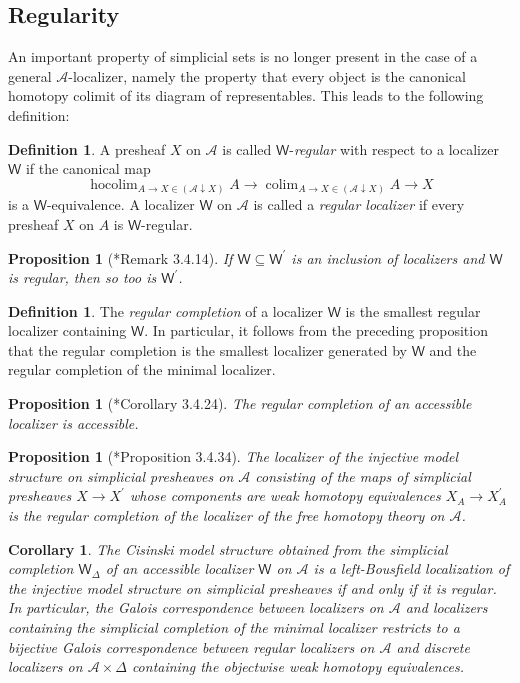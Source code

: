 \documentclass[a4paper]{article}
\numberwithin{equation}{subsection}
\theoremstyle{plain}   %
\newtheorem{prop}[equation]{Proposition}
\newtheorem{cor}[equation]{Corollary}
\theoremstyle{definition}
\newtheorem{defn}[equation]{Definition}
\theoremstyle{remark}
\theoremstyle{plain}
\DeclareMathOperator*{\coliml}{colim}
\newcommand{\overcat}[2]{{\left(#1\downarrow #2\right)}}
\DeclareMathOperator*{\hocoliml}{hocolim}
\begin{document}
\subsection{Regularity}
An important property of simplicial sets is no longer present in the case of a general \(\mathcal{A}\)-localizer, namely the property that every object is the canonical homotopy colimit of its diagram of representables.  This leads to the following definition:
\begin{defn}
	A presheaf \(X\) on \(\mathcal{A}\) is called \(\mathsf{W}\)-\emph{regular} with respect to a localizer \(\mathsf{W}\) if the canonical map 
	\[
		\hocoliml_{A\to X\in \overcat{\mathcal{A}}{X}} A \to \coliml_{A\to X\in \overcat{\mathcal{A}}{X}} A \to X
	\]
	is a \(\mathsf{W}\)-equivalence.
	A localizer \(\mathsf{W}\) on \(\mathcal{A}\) is called a \emph{regular localizer} if every presheaf \(X\) on \(A\) is \(\mathsf{W}\)-regular.
\end{defn}
\begin{prop}[\cite{cisinski-book}*{Remark 3.4.14}]\label{regularinclusion}
	If \(\mathsf{W} \subseteq \mathsf{W}^\prime\) is an inclusion of localizers and \(\mathsf{W}\) is regular, then so too is \(\mathsf{W^\prime}\).  
\end{prop}
\begin{defn}\label{regcompletion}
	The \emph{regular completion} of a localizer \(\mathsf{W}\) is the smallest regular localizer containing \(\mathsf{W}\).  In particular, it follows from the preceding proposition that the regular completion is the smallest localizer generated by \(\mathsf{W}\) and the regular completion of the minimal localizer.
\end{defn}
\begin{prop}[\cite{cisinski-book}*{Corollary 3.4.24}]
	The regular completion of an accessible localizer is accessible.
\end{prop}
\begin{prop}[\cite{cisinski-book}*{Proposition 3.4.34}]\label{injregular}
	The localizer of the injective model structure on simplicial presheaves on \(\mathcal{A}\) consisting of the maps of simplicial presheaves \(X\to X^\prime\) whose components are weak homotopy equivalences \(X_A\to  X^\prime_A\) is the regular completion of the localizer of the free homotopy theory on \(\mathcal{A}\).
\end{prop}
\begin{cor}
	The Cisinski model structure obtained from the simplicial completion \(\mathsf{W}_\Delta\) of an accessible localizer \(\mathsf{W}\) on \(\mathcal{A}\) is a left-Bousfield localization of the injective model structure on simplicial presheaves if and only if it is regular.  In particular, the Galois correspondence between localizers on \(\mathcal{A}\) and localizers containing the simplicial completion of the minimal localizer restricts to a bijective Galois correspondence between regular localizers on \(\mathcal{A}\) and discrete localizers on \(\mathcal{A}\times \Delta\) containing the objectwise weak homotopy equivalences.
\end{cor}
\end{document}
